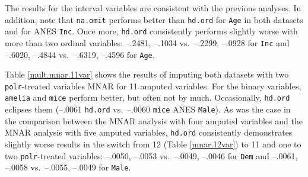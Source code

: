 \documentclass[12pt,econ]{sources/authesis}
\begin{document}
The results for the interval variables are consistent with the previous analyses. In addition, note that \texttt{na.omit} performs better than \texttt{hd.ord} for \texttt{Age} in both datasets and for ANES \texttt{Inc}. Once more, \texttt{hd.ord} consistently performs slightly worse with more than two ordinal variables: --.2481, --.1034 vs.~--.2299, --.0928 for \texttt{Inc} and --.6020, --.4844 vs.~--.6319, --.4596 for \texttt{Age}.

Table \ref{mult.mnar.11var} shows the results of imputing both datasets with two \texttt{polr}-treated variables MNAR for 11 amputed variables. For the binary variables, \texttt{amelia} and \texttt{mice} perform better, but often not by much. Occasionally, \texttt{hd.ord} eclipses them (--.0061 \texttt{hd.ord} vs.~--.0060 \texttt{mice} ANES \texttt{Male}). As was the case in the comparison between the MNAR analysis with four amputed variables and the MNAR analysis with five amputed variables, \texttt{hd.ord} consistently demonstrates slightly worse results in the switch from 12 (Table \ref{mnar.12var}) to 11 and one to two \texttt{polr}-treated variables: --.0050, --.0053 vs.~--.0049, --.0046 for \texttt{Dem} and --.0061, --.0058 vs.~--.0055, --.0049 for \texttt{Male}.

\ssp
\end{document}
